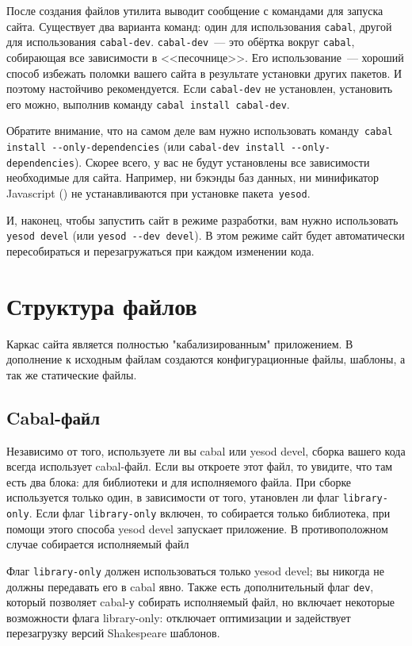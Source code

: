 После создания файлов утилита выводит сообщение с командами для запуска сайта.
Существует два варианта команд: один для использования \texttt{cabal},
другой для использования \texttt{cabal-dev}. \texttt{cabal-dev}~--- это обёртка
вокруг \texttt{cabal}, собирающая все зависимости в <<песочнице>>. Его
использование~--- хороший способ избежать поломки вашего сайта в результате установки других пакетов.
И поэтому настойчиво рекомендуется.
Если \texttt{cabal-dev} не установлен, установить его можно, выполнив команду
\texttt{cabal install cabal-dev}.

Обратите внимание, что на самом деле вам нужно использовать команду~\texttt{cabal install -{}-only-dependencies}
(или \texttt{cabal-dev install -{}-only-dependencies}). Скорее всего, у вас не будут
установлены все зависимости необходимые для сайта. Например, ни бэкэнды
баз данных, ни минификатор Javascript ()
не устанавливаются при установке пакета~\texttt{yesod}.

И, наконец, чтобы запустить сайт в режиме разработки, вам нужно использовать
\texttt{yesod devel} (или \texttt{yesod -{}-dev devel}). В этом режиме сайт будет автоматически
пересобираться и перезагружаться при каждом изменении кода.

\section{Структура файлов}

Каркас сайта является полностью "кабализированным" приложением. В дополнение
к исходным файлам создаются конфигурационные файлы, шаблоны, а так же статические файлы.

\subsection{Cabal-файл}

Независимо от того, используете ли вы cabal или yesod devel, сборка вашего кода всегда
использует cabal-файл. Если вы откроете этот файл, то увидите, что там есть два блока: для
библиотеки и для исполняемого файла. При сборке используется только один, в зависимости
от того, утановлен ли флаг \lstinline!library-only!. Если флаг \lstinline!library-only! включен,
то собирается только библиотека, при помощи этого способа yesod devel запускает приложение.
В противоположном случае собирается исполняемый файл

Флаг \lstinline!library-only! должен использоваться только yesod devel; вы никогда не должны
передавать его в cabal явно. Также есть дополнительный флаг \lstinline!dev!, который позволяет
cabal-у собирать исполняемый файл, но включает некоторые возможности флага library-only:
отключает оптимизации и задействует перезагрузку версий Shakespeare шаблонов.

